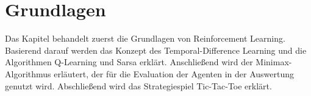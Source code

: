 \chapter{Grundlagen}
Das Kapitel behandelt zuerst die Grundlagen von Reinforcement Learning.
Basierend darauf werden das Konzept des Temporal-Difference Learning und die Algorithmen Q-Learning und Sarsa erklärt.
Anschließend wird der Minimax-Algorithmus erläutert, der für die Evaluation der Agenten in der Auswertung genutzt wird.
Abschließend wird das Strategiespiel Tic-Tac-Toe erklärt.







